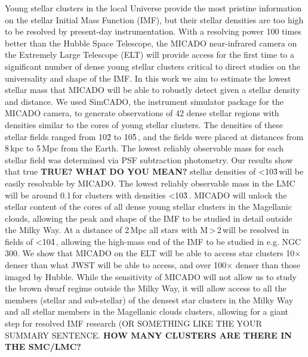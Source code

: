% 

\abstract
{Young stellar clusters in the local Universe provide the most pristine information on the stellar Initial Mass Function (IMF), but their stellar densities are too high to be resolved by present-day instrumentation. With a resolving power 100 times better than the Hubble Space Telescope, the MICADO near-infrared camera on the Extremely Large Telescope (ELT) will provide access for the first time to a significant number of dense young stellar clusters critical to direct studies on the universality and shape of the IMF.}
{In this work we aim to estimate the lowest stellar mass that MICADO will be able to robustly detect given a stellar density and distance.}
{We used SimCADO, the instrument simulator package for the MICADO camera, to generate observations of 42 dense stellar regions with densities similar to the cores of young stellar clusters. The densities of these stellar fields ranged from 10\h2 to 10\h5\,\spa, and the fields were placed at distances from 8\,kpc to 5\,Mpc from the Earth. The lowest reliably observable mass for each stellar field was determined via PSF subtraction photometry.}
{Our results show that true \textbf{TRUE? WHAT DO YOU MEAN?} stellar densities of \textless10\h3\,\spa will be easily resolvable by MICADO. The lowest reliably observable mass in the LMC will be around 0.1\,\msun for clusters with densities \textless10\h3\,\spa. MICADO will unlock the stellar content of the cores of all dense young stellar clusters in the Magellanic clouds, allowing the peak and shape of the IMF to be studied in detail outside the Milky Way. At a distance of 2\,Mpc all stars with M\,\textgreater\,2\,\msun will be resolved in fields of \textless10\h4\,\spa, allowing the high-mass end of the IMF to be studied in e.g. NGC\,300. }
{We show that MICADO on the ELT will be able to access star clusters 10$\times$ denser than what JWST will be able to access, and over 100$\times$ denser than those imaged by Hubble. While the sensitivity of MICADO will not allow us to study the brown dwarf regime outside the Milky Way, it will allow access to all the members (stellar and sub-stellar) of the densest star clusters in the Milky Way and all stellar members in the Magellanic clouds clusters, allowing for a giant step for resolved IMF research (OR SOMETHING LIKE THE YOUR SUMMARY SENTENCE. \textbf{HOW MANY CLUSTERS ARE THERE IN THE SMC/LMC?}}



